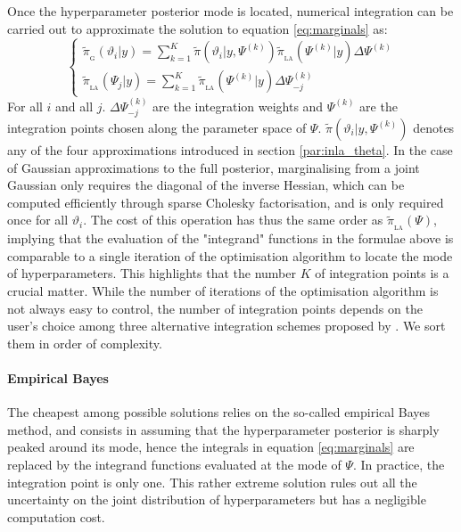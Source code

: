 \documentclass[openany, 11pt, oneside]{book}
\begin{document}
Once the hyperparameter posterior mode is located, numerical integration can be carried out to approximate the solution to equation \ref{eq:marginals} as:
$$
\left \{ \begin{array}{ll}
\tilde{\pi}_\mathrm{_G}\left(\vartheta_i \vert y\right)=
\sum_{k=1}^{K} \tilde{\pi} \left( \vartheta_i\vert y, \Psi^{(k)}\right)
 \tilde{\pi}_{_\mathrm{LA}}\left( \Psi^{(k)} \vert y\right)  \Delta \Psi^{(k)}
\\
\tilde{\pi}_{_\mathrm{LA}}\left(\Psi_j \vert y \right) = 
\sum_{k=1}^{K} \tilde{\pi}_{_\mathrm{LA}}\left( \Psi^{(k)} \vert y\right) \Delta \Psi_{-j}^{(k)}
\end{array} \right.
$$
For all $i$ and all $j$. $\Delta \Psi_{-j}^{(k)}$ are the integration weights and $\Psi^{(k)}$ are the integration points chosen along the parameter space of $\Psi$. $\tilde{\pi} \left( \vartheta_i\vert y, \Psi^{(k)}\right)$ denotes any of the four approximations introduced in section \ref{par:inla_theta}. In the case of Gaussian approximations to the full posterior, marginalising from a joint Gaussian only requires the diagonal of the inverse Hessian, which can be computed efficiently through sparse Cholesky factorisation, and is only required once for all $\vartheta_i$. The cost of this operation has thus the same order as $\tilde{\pi}_\mathrm{_{LA}}(\Psi)$, implying that the evaluation of the "integrand" functions in the formulae above is comparable to a single iteration of the optimisation algorithm to locate the mode of hyperparameters. This highlights that the number $K$ of integration points is a crucial matter. While the number of iterations of the optimisation algorithm is not always easy to control, the number of integration points depends on the user's choice among three alternative integration schemes proposed by \cite{INLA}. We sort them in order of complexity.

\paragraph{Empirical Bayes}
The cheapest among possible solutions relies on the so-called empirical Bayes method, and consists in assuming that the hyperparameter posterior is sharply peaked around its mode, hence the integrals in equation \ref{eq:marginals} are replaced by the integrand functions evaluated at the mode of $\Psi$. In practice, the integration point is only one. This rather extreme solution rules out all the uncertainty on the joint distribution of hyperparameters but has a negligible computation cost.
\end{document}
